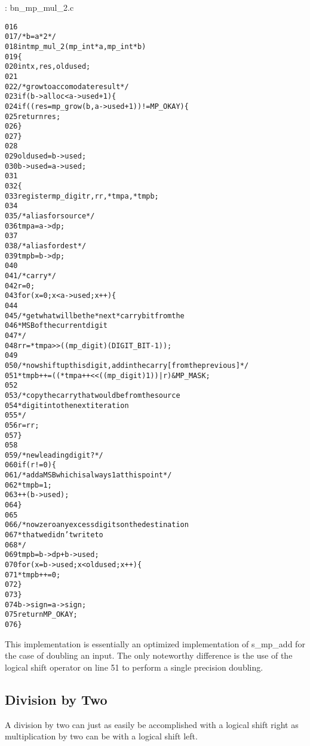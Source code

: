\documentclass[b5paper]{book}
\begin{document}
\vspace{+3mm}\begin{small}
\hspace{-5.1mm}{\bf File}: bn\_mp\_mul\_2.c
\vspace{-3mm}
\begin{alltt}
016   
017   /* b = a*2 */
018   int mp_mul_2(mp_int * a, mp_int * b)
019   \{
020     int     x, res, oldused;
021   
022     /* grow to accomodate result */
023     if (b->alloc < a->used + 1) \{
024       if ((res = mp_grow (b, a->used + 1)) != MP_OKAY) \{
025         return res;
026       \}
027     \}
028   
029     oldused = b->used;
030     b->used = a->used;
031   
032     \{
033       register mp_digit r, rr, *tmpa, *tmpb;
034   
035       /* alias for source */
036       tmpa = a->dp;
037       
038       /* alias for dest */
039       tmpb = b->dp;
040   
041       /* carry */
042       r = 0;
043       for (x = 0; x < a->used; x++) \{
044       
045         /* get what will be the *next* carry bit from the 
046          * MSB of the current digit 
047          */
048         rr = *tmpa >> ((mp_digit)(DIGIT_BIT - 1));
049         
050         /* now shift up this digit, add in the carry [from the previous] */
051         *tmpb++ = ((*tmpa++ << ((mp_digit)1)) | r) & MP_MASK;
052         
053         /* copy the carry that would be from the source 
054          * digit into the next iteration 
055          */
056         r = rr;
057       \}
058   
059       /* new leading digit? */
060       if (r != 0) \{
061         /* add a MSB which is always 1 at this point */
062         *tmpb = 1;
063         ++(b->used);
064       \}
065   
066       /* now zero any excess digits on the destination 
067        * that we didn't write to 
068        */
069       tmpb = b->dp + b->used;
070       for (x = b->used; x < oldused; x++) \{
071         *tmpb++ = 0;
072       \}
073     \}
074     b->sign = a->sign;
075     return MP_OKAY;
076   \}
\end{alltt}
\end{small}

This implementation is essentially an optimized implementation of s\_mp\_add for the case of doubling an input.  The only noteworthy difference
is the use of the logical shift operator on line 51 to perform a single precision doubling.  

\subsection{Division by Two}
A division by two can just as easily be accomplished with a logical shift right as multiplication by two can be with a logical shift left.
\end{document}
